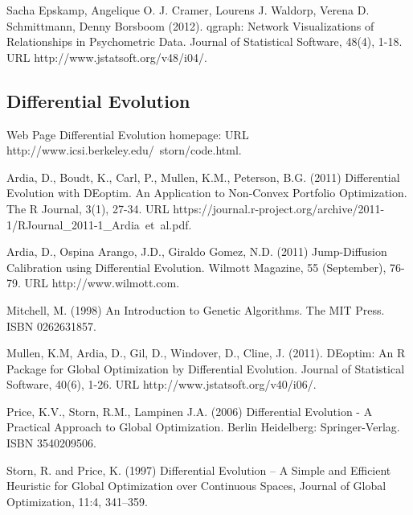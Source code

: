 Sacha Epskamp, Angelique O. J. Cramer, Lourens J. Waldorp, Verena D. Schmittmann, Denny Borsboom (2012). 
\newblock qgraph: Network Visualizations of Relationships in Psychometric Data. 
\newblock Journal of Statistical Software, 48(4), 1-18. URL http://www.jstatsoft.org/v48/i04/.

\subsection{Differential Evolution}

 Web Page
\newblock Differential Evolution homepage: 
\newblock URL http://www.icsi.berkeley.edu/~storn/code.html.

Ardia, D., Boudt, K., Carl, P., Mullen, K.M., Peterson, B.G. (2011) 
\newblock Differential Evolution with DEoptim. An Application to Non-Convex Portfolio Optimization. 
\newblock The R Journal, 3(1), 27-34. URL https://journal.r-project.org/archive/2011-1/RJournal_2011-1_Ardia~et~al.pdf.

Ardia, D., Ospina Arango, J.D., Giraldo Gomez, N.D. (2011) 
\newblock Jump-Diffusion Calibration using Differential Evolution. 
\newblock Wilmott Magazine, 55 (September), 76-79. URL http://www.wilmott.com.

Mitchell, M. (1998) An Introduction to Genetic Algorithms.
\newblock The MIT Press. 
\newblock ISBN 0262631857.

Mullen, K.M, Ardia, D., Gil, D., Windover, D., Cline, J. (2011). 
\newblock DEoptim: An R Package for Global Optimization by Differential Evolution. 
\newblock Journal of Statistical Software, 40(6), 1-26. URL http://www.jstatsoft.org/v40/i06/.

Price, K.V., Storn, R.M., Lampinen J.A. (2006) 
\newblock Differential Evolution - A Practical Approach to Global Optimization. 
\newblock Berlin Heidelberg: Springer-Verlag. ISBN 3540209506.

Storn, R. and Price, K. (1997) 
\newblock Differential Evolution – A Simple and Efficient Heuristic for Global Optimization over Continuous Spaces, 
\newblock Journal of Global Optimization, 11:4, 341–359.


